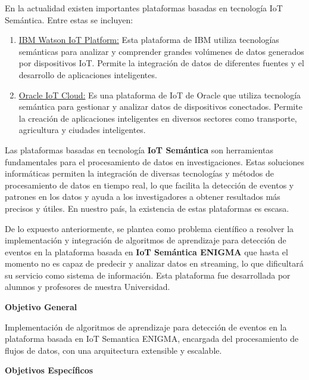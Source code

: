 \documentclass[12pt]{article}
\begin{document}
En la actualidad existen importantes plataformas basadas en tecnología IoT Semántica. Entre estas se incluyen:

\begin{enumerate}
    \item {
        \href{https://internetofthings.ibmcloud.com/}{IBM Watson IoT Platform:} Esta plataforma de IBM utiliza tecnologías semánticas para analizar y comprender grandes volúmenes de datos generados por dispositivos IoT. Permite la integración de datos de diferentes fuentes y el desarrollo de aplicaciones inteligentes.
    }
    \item {
        \href{https://www.oracle.com/internet-of-things/}{Oracle IoT Cloud:} Es una plataforma de IoT de Oracle que utiliza tecnología semántica para gestionar y analizar datos de dispositivos conectados. Permite la creación de aplicaciones inteligentes en diversos sectores como transporte, agricultura y ciudades inteligentes.
    }
\end{enumerate}

Las plataformas basadas en tecnología \textbf{IoT Semántica} son herramientas fundamentales para el procesamiento de datos en investigaciones. Estas soluciones informáticas permiten la integración de diversas tecnologías y métodos de procesamiento de datos en tiempo real, lo que facilita la detección de eventos y patrones en los datos y ayuda a los investigadores a obtener resultados más precisos y útiles. En nuestro país, la existencia de estas plataformas es escasa.

De lo expuesto anteriormente, se plantea como problema científico a resolver la implementación y integración de algoritmos de aprendizaje para detección de eventos en la plataforma basada en \textbf{IoT Semántica ENIGMA} que hasta el momento no es capaz de predecir y analizar datos en streaming, lo que dificultará su servicio como sistema de información. Esta plataforma fue desarrollada por alumnos y profesores de nuestra Universidad.

\vspace*{1cm}
\noindent \textbf{Objetivo General}
\vspace*{1cm}

Implementación de algoritmos de aprendizaje para detección de eventos en la plataforma basada en IoT Semantica ENIGMA, encargada del procesamiento de flujos de datos, con una arquitectura extensible y escalable.

\vspace*{1cm}
\noindent \textbf{Objetivos Espec\'ificos}
\end{document}
